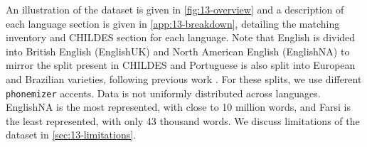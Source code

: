 
An illustration of the dataset is given in \cref{fig:13-overview} and a description of each language section is given in \cref{app:13-breakdown}, detailing the matching \phoible inventory and CHILDES section for each language. Note that English is divided into British English (EnglishUK) and North American English (EnglishNA) to mirror the split present in CHILDES and Portuguese is also split into European and Brazilian varieties, following previous work \citep{caines2019cross, goriely2023word}. For these splits, we use different \texttt{phonemizer} accents. Data is not uniformly distributed across languages. EnglishNA is the most represented, with close to 10 million words, and Farsi is the least represented, with only 43 thousand words. We discuss limitations of the dataset in \cref{sec:13-limitations}.

